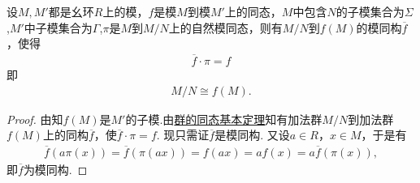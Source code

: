 \documentclass[../../main.tex]{subfiles}%
\begin{document}
\begin{theorem}[模同态的基本定理]\label{theorem:模同态的基本定理}
设$M, M'$都是幺环$R$上的模，$f$是模$M$到模$M'$上的同态，$M$中包含$N$的子模集合为$\Sigma$,$M'$中子模集合为$\Gamma$,$\pi$是$M$到$M/N$上的自然模同态，则有$M/N$到$f(M)$的模同构$\overline{f}$，使得
\begin{align}
\overline{f} \cdot \pi = f \label{eq::::--928fh3489h4h3t4g1.7.10}
\end{align}
即
\begin{align*}
M/N \cong f(M).
\end{align*}
\end{theorem}
\begin{proof}
由知$f(M)$是$M'$的子模.由\hyperref[theorem:群的同态基本定理]{群的同态基本定理}知有加法群$M/N$到加法群$f(M)$上的同构$\overline{f}$，使$\overline{f} \cdot \pi = f$. 现只需证$\overline{f}$是模同构. 又设$a \in R$，$x \in M$，于是有
\begin{align*}
\overline{f}(a\pi(x)) = \overline{f}(\pi(ax)) = f(ax) = af(x) = a\overline{f}(\pi(x)),
\end{align*}
即$\overline{f}$为模同构. 
\end{proof}
\end{document}

